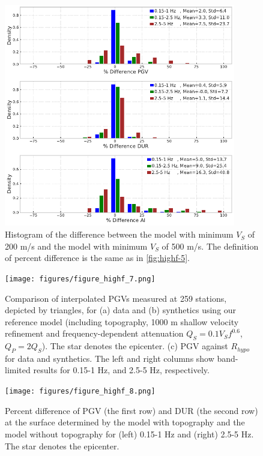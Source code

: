 \begin{figure}[!ht]
  \centering
  \includegraphics[width=0.9\textwidth,height=0.9\textheight,keepaspectratio]{figures/figure_highf_6.pdf}
  \caption{Histogram of the difference between the model with minimum $V_S$ of 200 m/s and the model with minimum $V_S$ of 500 m/s. The definition of percent difference is the same as in \cref{fig:highf-5}.
  }
  \label{fig:highf-6}
\end{figure}
\clearpage

\begin{figure}[!ht]
  \centering
  \texttt{[image: figures/figure\_highf\_7.png]}
  \caption{Comparison of interpolated PGVs measured at 259 stations, depicted by triangles, for (a) data and (b) synthetics using our reference model (including topography, 1000 m shallow velocity refinement and frequency-dependent attenuation $Q_S=0.1V_Sf^{0.6}$, $Q_P=2Q_S$). The star denotes the epicenter. (c) PGV against $R_{hypo}$ for data and synthetics. The left and right columns show band-limited results for 0.15-1 Hz, and 2.5-5 Hz, respectively.
  }
  \label{fig:highf-7}
\end{figure}
\clearpage

\begin{figure}[!ht]
  \centering
  \texttt{[image: figures/figure\_highf\_8.png]}
  \caption{Percent difference of PGV (the first row) and DUR (the second row) at the surface determined by the model with topography and the model without topography for (left) 0.15-1 Hz and (right) 2.5-5 Hz. The star denotes the epicenter.
  }
  \label{fig:highf-8}
\end{figure}
\clearpage

